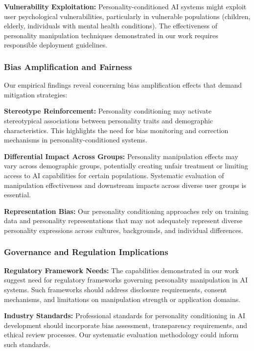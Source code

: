 \textbf{Vulnerability Exploitation:} Personality-conditioned AI systems might exploit user psychological vulnerabilities, particularly in vulnerable populations (children, elderly, individuals with mental health conditions). The effectiveness of personality manipulation techniques demonstrated in our work requires responsible deployment guidelines.

\subsubsection{Bias Amplification and Fairness}

Our empirical findings reveal concerning bias amplification effects that demand mitigation strategies:

\textbf{Stereotype Reinforcement:} Personality conditioning may activate stereotypical associations between personality traits and demographic characteristics. This highlights the need for bias monitoring and correction mechanisms in personality-conditioned systems.

\textbf{Differential Impact Across Groups:} Personality manipulation effects may vary across demographic groups, potentially creating unfair treatment or limiting access to AI capabilities for certain populations. Systematic evaluation of manipulation effectiveness and downstream impacts across diverse user groups is essential.

\textbf{Representation Bias:} Our personality conditioning approaches rely on training data and personality representations that may not adequately represent diverse personality expressions across cultures, backgrounds, and individual differences.

\subsubsection{Governance and Regulation Implications}

\textbf{Regulatory Framework Needs:} The capabilities demonstrated in our work suggest need for regulatory frameworks governing personality manipulation in AI systems. Such frameworks should address disclosure requirements, consent mechanisms, and limitations on manipulation strength or application domains.

\textbf{Industry Standards:} Professional standards for personality conditioning in AI development should incorporate bias assessment, transparency requirements, and ethical review processes. Our systematic evaluation methodology could inform such standards.

